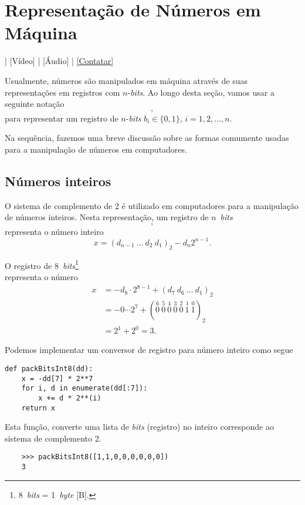 \section{Representação de Números em Máquina}\label{cap_artm_sec_repummaq}

\begin{flushright}
  [YouTube] | [Vídeo] | [Áudio] | \href{https://phkonzen.github.io/notas/contato.html}{[Contatar]}
\end{flushright}

Usualmente, números são manipulados em máquina através de suas representações em registros com $n$-{\it bits}. Ao longo desta seção, vamos usar a seguinte notação
\begin{equation}
  [b_1 ~ b_2 ~ b_3 ~ \cdots ~ b_n],
\end{equation}
para representar um registro de $n$-{\it bits} $b_i\in\{0, 1\}$, $i=1, 2, \dotsc, n$.

Na sequência, fazemos uma breve discussão sobre as formas comumente usadas para a manipulação de números em computadores.

\subsection{Números inteiros}

O sistema de complemento de 2 é utilizado em computadores para a manipulação de números inteiros. Nesta representação, um registro de $n$~{\it bits}
\begin{equation}
  [d_1 ~ d_2 ~ d_3 ~ \cdots ~ d_n],
\end{equation}
representa o número inteiro
\begin{equation}
  x = (d_{n-1}~\ldots~d_2~d_1)_2 - d_n2^{n-1}.
\end{equation}

\begin{ex}
  O registro de 8~{\it bits}\footnote{8~{\it bits} = 1~{\it byte} [B].}
  \begin{equation}
    [1 ~ 1 ~ 0 ~ 0 ~ 0 ~ 0 ~ 0 ~ 0]
  \end{equation}
  representa o número
  \begin{align}
    x &= -d_8\cdot 2^{8-1} + (d_7~d_6~\ldots~d_1)_2\\
      &= -0\cdots 2^{7} + (\stackrel{6}{0}~\stackrel{5}{0}~\stackrel{4}{0}~\stackrel{3}{0}~\stackrel{2}{0}~\stackrel{1}{1}~\stackrel{0}{1})_2\\
      &= 2^1 + 2^0 = 3.
  \end{align}
  
  \ifispython
  Podemos implementar um conversor de registro para número inteiro como segue
  \begin{lstlisting}[caption=packbits8.py, label=py:packbits8]
    def packBitsInt8(dd):
    x = -dd[7] * 2**7
    for i, d in enumerate(dd[:7]):
        x += d * 2**(i)
    return x
  \end{lstlisting}
  Esta função, converte uma lista de {\it bits} (registro) no inteiro corresponde ao sistema de complemento 2.
  \begin{lstlisting}
    >>> packBitsInt8([1,1,0,0,0,0,0,0])
    3
  \end{lstlisting}
  \fi
\end{ex}

